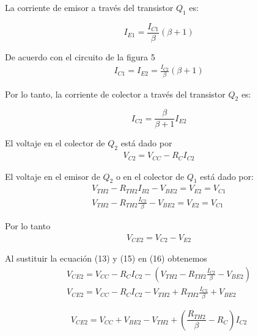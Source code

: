 \documentclass[12pt]{article}
\begin{document}
\noindent La corriente de emisor a través del transistor $Q_1$ es:
\begin{tcolorbox}[colback=red!5!white,colframe=red!75!black,arc=0mm,boxrule=0mm,width=(\linewidth+0.5cm)]
	\begin{equation}
		I_{E1} = \frac{I_{C1}}{\beta}(\beta +1)
	\end{equation}
\end{tcolorbox}

De acuerdo con el circuito de la figura 5
\begin{align}
	I_{C1} = I_{E2} = \frac{I_{C2}}{\beta}(\beta + 1)
\end{align}

\noindent Por lo tanto, la corriente de colector a través del transistor $Q_2$ es:
\begin{tcolorbox}[colback=red!5!white,colframe=red!75!black,arc=0mm,boxrule=0mm,width=(\linewidth+0.5cm)]
	\begin{equation}
		I_{C2} = \frac{\beta}{\beta + 1}I_{E2}
	\end{equation}
\end{tcolorbox}

\noindent El voltaje en el colector de $Q_2$ está dado por
\begin{align}
	V_{C2} = V_{CC} - R_CI_{C2}
\end{align}

\noindent El voltaje en el emisor de $Q_2$ o en el colector de $Q_1$ está dado por:
\begin{align}
	V_{TH2} - R_{TH2}I_{B2} - V_{BE2} = V_{E2} = V_{C1}\\
	V_{TH2} - R_{TH2}\frac{I_{C2}}{\beta} - V_{BE2} = V_{E2} = V_{C1}
\end{align}

\noindent Por lo tanto
\begin{align}
	V_{CE2	} = V_{C2} - V_{E2}
\end{align}

Al sustituir la ecuación (13) y (15) en (16) obtenemos
\begin{align}
	V_{CE2} = V_{CC} - R_C I_{C2} - \left( V_{TH2} - R_{TH2}\frac{I_{C2}}{\beta} - V_{BE2} \right)\\
	V_{CE2} = V_{CC} - R_C I_{C2} - V_{TH2} + R_{TH2}\frac{I_{C2}}{\beta} + V_{BE2}
\end{align}

\begin{tcolorbox}[colback=red!5!white,colframe=red!75!black,arc=0mm,boxrule=0mm,width=(\linewidth+0.5cm)]
	\begin{equation}
		V_{CE2} = V_{CC} + V_{BE2} - V_{TH2} + \left( \frac{R_{TH2}}{\beta} - R_C \right)I_{C2}
	\end{equation}
\end{tcolorbox}
\end{document}
